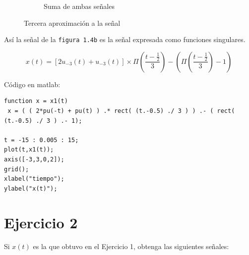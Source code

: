 \documentclass[10pt,a4paper]{report}
\begin{document}
\begin{figure}[H]
\begin{center}
\begin{subfigure}{0.5\textwidth}
\begin{center}
        \caption{Suma de ambas señales}
        \label{fig:Aprox3b}
      \end{center}
    \end{subfigure}
    
    \caption{Tercera aproximación a la señal}
    \label{fig:Aprox3}
  \end{center}
\end{figure}

Así la señal de la \texttt{figura 1.4b} es la señal expresada como funciones singulares.

\[ x(t) = \left[2u_{-3}\left(t\right)+u_{-3}\left(t\right)\right]\times\Pi\left(\frac{t-\frac{1}{2}}3\right)-\left(\Pi\left(\frac{t-\frac{1}{2}}3\right)-1\right) \] 

Código en matlab:

\begin{lstlisting}
function x = x1(t)
 x = ( ( 2*pu(-t) + pu(t) ) .* rect( (t.-0.5) ./ 3 ) ) .- ( rect( (t.-0.5) ./ 3 ) .- 1);
         
t = -15 : 0.005 : 15;
plot(t,x1(t));
axis([-3,3,0,2]);
grid();
xlabel("tiempo");
ylabel("x(t)"); 
\end{lstlisting}



\section{Ejercicio 2}
Si $x\left(t\right)$ es la que obtuvo en el Ejercicio 1, obtenga las siguientes señales:
\end{document}
